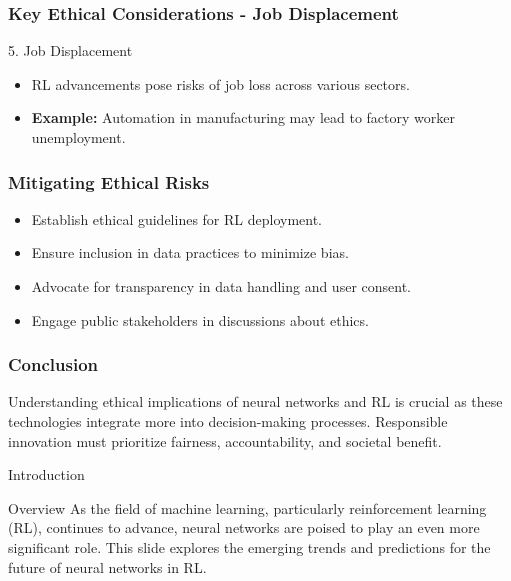 \documentclass[aspectratio=169]{beamer}
\begin{document}
\begin{frame}[fragile]
    \frametitle{Key Ethical Considerations - Job Displacement}
    \begin{block}{5. Job Displacement}
        \begin{itemize}
            \item RL advancements pose risks of job loss across various sectors.
            \item \textbf{Example:} Automation in manufacturing may lead to factory worker unemployment.
        \end{itemize}
    \end{block}
\end{frame}

\begin{frame}[fragile]
    \frametitle{Mitigating Ethical Risks}
    \begin{itemize}
        \item Establish ethical guidelines for RL deployment.
        \item Ensure inclusion in data practices to minimize bias.
        \item Advocate for transparency in data handling and user consent.
        \item Engage public stakeholders in discussions about ethics.
    \end{itemize}
\end{frame}

\begin{frame}[fragile]
    \frametitle{Conclusion}
    Understanding ethical implications of neural networks and RL is crucial as these technologies integrate more into decision-making processes.  
    Responsible innovation must prioritize fairness, accountability, and societal benefit.
\end{frame}

\begin{frame}[fragile]{Introduction}
    \begin{block}{Overview}
    As the field of machine learning, particularly reinforcement learning (RL), continues to advance, neural networks are poised to play an even more significant role. This slide explores the emerging trends and predictions for the future of neural networks in RL.
    \end{block}
\end{frame}
\end{document}
